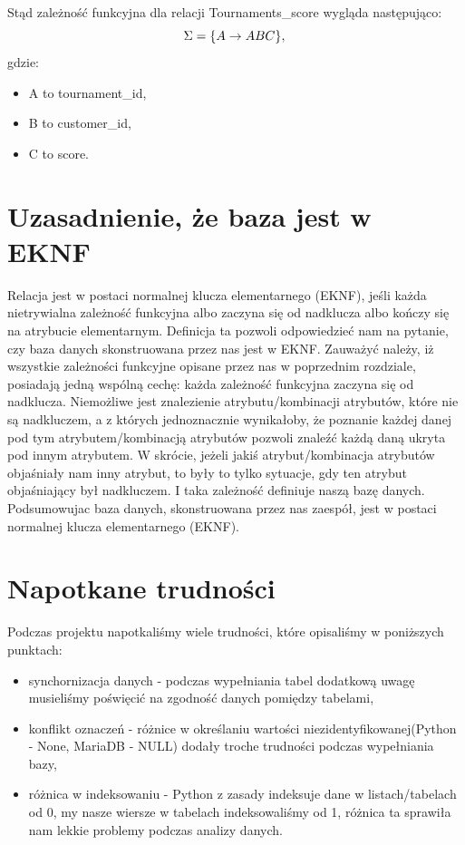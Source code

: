 \documentclass{article}
\theoremstyle{break}
\begin{document}
	Stąd zależność funkcyjna dla relacji Tournaments\_score wygląda następująco:
		$$ \Sigma = \{A \rightarrow ABC\}, \\ $$
	gdzie:
	\begin{itemize}
		\item A to tournament\_id,
		\item B to customer\_id,
		\item C to score.
	\end{itemize}
	\section{Uzasadnienie, że baza jest w EKNF}
	Relacja jest w postaci normalnej klucza elementarnego (EKNF), jeśli każda nietrywialna zależność funkcyjna albo zaczyna się od nadklucza albo kończy się na atrybucie elementarnym. Definicja ta pozwoli odpowiedzieć nam na pytanie, czy baza danych skonstruowana przez nas jest w EKNF. Zauważyć należy, iż wszystkie zależności funkcyjne opisane przez nas w poprzednim rozdziale, posiadają jedną wspólną cechę: każda zależność funkcyjna zaczyna się od nadklucza. Niemożliwe jest znalezienie atrybutu/kombinacji atrybutów, które nie są nadkluczem, a z których jednoznacznie wynikałoby, że poznanie każdej danej pod tym atrybutem/kombinacją atrybutów pozwoli znaleźć każdą daną ukryta pod innym atrybutem. W skrócie, jeżeli jakiś atrybut/kombinacja atrybutów objaśniały nam inny atrybut, to były to tylko sytuacje, gdy ten atrybut objaśniający był nadkluczem. I taka zależność definiuje naszą bazę danych. Podsumowujac baza danych, skonstruowana przez nas zaespół, jest w postaci normalnej klucza elementarnego (EKNF).
	\section{Napotkane trudności}
	Podczas projektu napotkaliśmy wiele trudności, które opisaliśmy w poniższych punktach:
	\begin{itemize}
	 \item synchornizacja danych - podczas wypełniania tabel dodatkową uwagę musieliśmy poświęcić na zgodność danych pomiędzy tabelami,
	 \item konflikt oznaczeń - różnice w określaniu wartości niezidentyfikowanej(Python - None, MariaDB - NULL) dodały troche trudności podczas wypełniania bazy,
	 \item różnica w indeksowaniu - Python z zasady indeksuje dane w listach/tabelach od 0, my nasze wiersze w tabelach indeksowaliśmy od 1, różnica ta sprawiła nam lekkie problemy podczas analizy danych.
 	\end{itemize}
\end{document}
